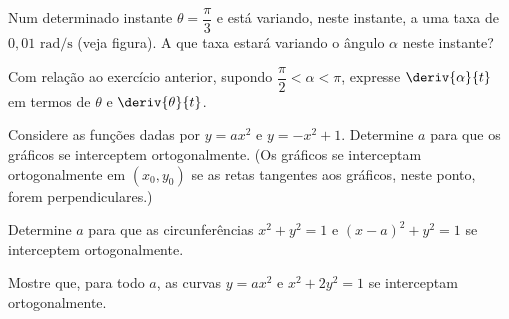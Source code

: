 \begin{exercicio}[15]
\label{ex:7.17.15}
Num determinado instante $\theta = \dfrac{\pi}{3}$ e está variando, neste instante, a uma taxa de $0{,}01\text{ rad/s}$ (veja figura). A que taxa estará variando o ângulo $\alpha$ neste instante?

\begin{center}
\end{center}
\end{exercicio}

\begin{exercicio}[16]
\label{ex:7.17.16}
Com relação ao exercício anterior, supondo $\dfrac{\pi}{2} < \alpha < \pi$, expresse $\deriv{\alpha}{t}$ em termos de $\theta$ e $\deriv{\theta}{t}$.
\end{exercicio}

\begin{exercicio}[17]
\label{ex:7.17.17}
Considere as funções dadas por $y = ax^2$ e $y = -x^2 + 1$. Determine $a$ para que os gráficos se interceptem ortogonalmente. (Os gráficos se interceptam ortogonalmente em $(x_0, y_0)$ se as retas tangentes aos gráficos, neste ponto, forem perpendiculares.)
\end{exercicio}

\begin{exercicio}[18]
\label{ex:7.17.18}
Determine $a$ para que as circunferências $x^2 + y^2 = 1$ e $(x - a)^2 + y^2 = 1$ se interceptem ortogonalmente.
\end{exercicio}

\begin{exercicio}[19]
\label{ex:7.17.19}
Mostre que, para todo $a$, as curvas $y = ax^2$ e $x^2 + 2y^2 = 1$ se interceptam ortogonalmente.
\end{exercicio}

